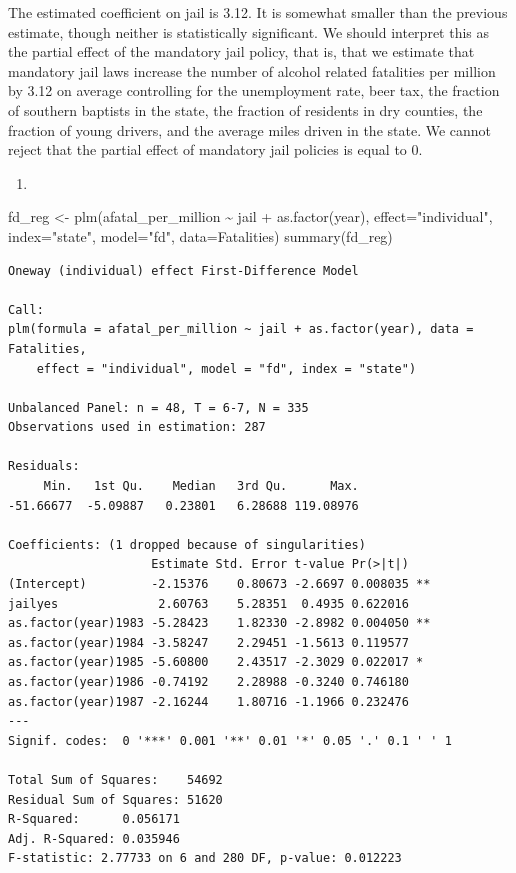\documentclass[
  letterpaper,
  DIV=11,
  numbers=noendperiod]{scrreprt}
\newenvironment{Shaded}{\begin{snugshade}}{\end{snugshade}}
\newcommand{\AttributeTok}[1]{\textcolor[rgb]{0.40,0.45,0.13}{#1}}
\newcommand{\FunctionTok}[1]{\textcolor[rgb]{0.28,0.35,0.67}{#1}}
\newcommand{\NormalTok}[1]{\textcolor[rgb]{0.00,0.23,0.31}{#1}}
\newcommand{\OtherTok}[1]{\textcolor[rgb]{0.00,0.23,0.31}{#1}}
\newcommand{\SpecialCharTok}[1]{\textcolor[rgb]{0.37,0.37,0.37}{#1}}
\newcommand{\StringTok}[1]{\textcolor[rgb]{0.13,0.47,0.30}{#1}}
\providecommand{\tightlist}{%
  \setlength{\itemsep}{0pt}\setlength{\parskip}{0pt}}\usepackage{longtable,booktabs,array}
\begin{document}
The estimated coefficient on jail is 3.12. It is somewhat smaller than
the previous estimate, though neither is statistically significant. We
should interpret this as the partial effect of the mandatory jail
policy, that is, that we estimate that mandatory jail laws increase the
number of alcohol related fatalities per million by 3.12 on average
controlling for the unemployment rate, beer tax, the fraction of
southern baptists in the state, the fraction of residents in dry
counties, the fraction of young drivers, and the average miles driven in
the state. We cannot reject that the partial effect of mandatory jail
policies is equal to 0.

\begin{enumerate}
\def\labelenumi{\arabic{enumi}.}
\setcounter{enumi}{3}
\tightlist
\item
\end{enumerate}

\begin{Shaded}
\begin{Highlighting}[]
\NormalTok{fd\_reg }\OtherTok{\textless{}{-}} \FunctionTok{plm}\NormalTok{(afatal\_per\_million }\SpecialCharTok{\textasciitilde{}}\NormalTok{ jail }\SpecialCharTok{+} \FunctionTok{as.factor}\NormalTok{(year),}
              \AttributeTok{effect=}\StringTok{"individual"}\NormalTok{,}
              \AttributeTok{index=}\StringTok{"state"}\NormalTok{, }\AttributeTok{model=}\StringTok{"fd"}\NormalTok{,}
              \AttributeTok{data=}\NormalTok{Fatalities)}
\FunctionTok{summary}\NormalTok{(fd\_reg)}
\end{Highlighting}
\end{Shaded}

\begin{verbatim}
Oneway (individual) effect First-Difference Model

Call:
plm(formula = afatal_per_million ~ jail + as.factor(year), data = Fatalities, 
    effect = "individual", model = "fd", index = "state")

Unbalanced Panel: n = 48, T = 6-7, N = 335
Observations used in estimation: 287

Residuals:
     Min.   1st Qu.    Median   3rd Qu.      Max. 
-51.66677  -5.09887   0.23801   6.28688 119.08976 

Coefficients: (1 dropped because of singularities)
                    Estimate Std. Error t-value Pr(>|t|)   
(Intercept)         -2.15376    0.80673 -2.6697 0.008035 **
jailyes              2.60763    5.28351  0.4935 0.622016   
as.factor(year)1983 -5.28423    1.82330 -2.8982 0.004050 **
as.factor(year)1984 -3.58247    2.29451 -1.5613 0.119577   
as.factor(year)1985 -5.60800    2.43517 -2.3029 0.022017 * 
as.factor(year)1986 -0.74192    2.28988 -0.3240 0.746180   
as.factor(year)1987 -2.16244    1.80716 -1.1966 0.232476   
---
Signif. codes:  0 '***' 0.001 '**' 0.01 '*' 0.05 '.' 0.1 ' ' 1

Total Sum of Squares:    54692
Residual Sum of Squares: 51620
R-Squared:      0.056171
Adj. R-Squared: 0.035946
F-statistic: 2.77733 on 6 and 280 DF, p-value: 0.012223
\end{verbatim}
\end{document}
